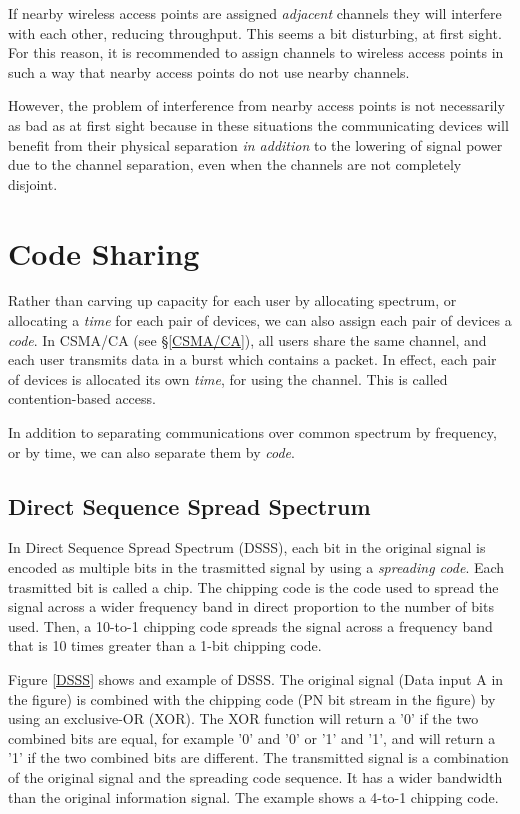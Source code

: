 If nearby wireless access points are assigned {\em adjacent} channels
they will interfere with each other, reducing throughput. This seems a bit disturbing,
at first sight. For this reason, it is recommended to assign channels to wireless
access points in such a way that nearby access points do not use nearby channels.

However, the problem of interference from nearby access points is not necessarily
as bad as at first sight because in these situations the communicating devices
will benefit from their physical separation {\em in addition} to the lowering
of signal power due to the channel separation, even when the channels are not
completely disjoint.

\section{Code Sharing}

Rather than carving up capacity for each user by allocating spectrum, or 
allocating a {\em time} for each pair of devices, 
we can also assign each pair of devices a {\em code}. In CSMA/CA (see \S\ref{CSMA/CA}),
all users share the same channel, and each user transmits data
in a burst which contains a packet. In effect, each pair of devices is
allocated its own {\em time}, for using the channel. This is called contention-based 
access. 

In addition to separating communications over common spectrum by frequency,
or by time, we can also separate them by {\em code}. 

\subsection{Direct Sequence Spread Spectrum}
	  		
In Direct Sequence Spread Spectrum 
(DSSS), each bit in the original signal is encoded as multiple
bits in the trasmitted signal by using a {\em spreading code}. 
Each trasmitted bit is called a chip. The chipping
code is the code used to spread the signal across a wider frequency band in direct proportion to the number
of bits used. Then, a 10-to-1 chipping code spreads the signal across a frequency band that is 10 times
greater than a 1-bit chipping code. 

Figure \ref{DSSS} shows and example of DSSS. The original signal
(Data input A in the figure) is combined with the chipping code (PN bit stream in the figure) by using
an exclusive-OR (XOR). The XOR function will return a '0' if the two combined bits are equal, for example
'0' and '0' or '1' and '1', and will return a '1' if the two combined bits are different. The transmitted signal
is a combination of the original signal and the spreading code sequence. It has a wider bandwidth
than the original information signal. The example shows a 4-to-1 chipping code.
	  		
